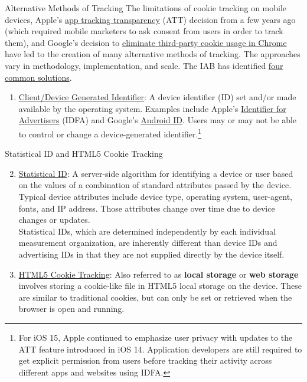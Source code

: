 \documentclass[pdf]{beamer}
\newcommand{\empr}[1]{{\color{franklinblue}\textbf{#1}}}
\theoremstyle{remark}
\theoremstyle{definition}
\begin{document}
\begin{frame}[t]{Alternative Methods of Tracking}
The limitations of cookie tracking on mobile devices, Apple's \href{https://www.apple.com/newsroom/2021/01/data-privacy-day-at-apple-improving-transparency-and-empowering-users/}{app tracking transparency} (ATT) decision from a few years ago (which required mobile marketers to ask consent from users in order to track them), and Google's decision to \href{https://blog.google/products/chrome/privacy-sandbox-tracking-protection/}{eliminate third-party cookie usage in Chrome} have led to the creation of many
alternative methods of tracking. The approaches vary in methodology, implementation, and scale.  The IAB has identified \href{https://www.iab.com/wp-content/uploads/2015/08/IABDigitalSimplifiedMobileCookies.pdf}{four common solutions}. \\
\vspace{0.5ex}
\small
\begin{enumerate}
\item \underline{Client/Device Generated Identifier}: A device identifier (ID) set and/or made available by the operating system. Examples include Apple's  \href{https://developer.apple.com/documentation/adsupport/asidentifiermanager/advertisingidentifier}{Identifier for Advertisers} (IDFA) and  Google's  \href{https://support.google.com/googleplay/android-developer/answer/6048248?hl=en\#zippy=\%2Cpersistent-identifiers-including-android-id}{Android ID}.  Users may or may not be able to control or change a device-generated identifier.\footnote{For iOS 15, Apple continued to emphasize user privacy with updates to the ATT feature introduced in iOS 14. Application developers are still required to get explicit permission from users before tracking their activity across different apps and websites using IDFA.}
\end{enumerate}
\end{frame}

\begin{frame}[t]{Statistical ID and HTML5 Cookie Tracking}
\small
\begin{enumerate}
  \setcounter{enumi}{1}
\item \underline{Statistical ID}: A server-side algorithm for identifying a device or user based on the values of a combination of standard attributes passed by the device. Typical device attributes include device type, operating system, user-agent, fonts, and IP address. Those attributes change over time due to device changes or updates. \\
\vspace{1.5ex}
Statistical IDs, which are determined independently by each individual measurement organization, are inherently different than device IDs and advertising IDs in that they are not supplied directly by the device itself. 
\item \underline{HTML5 Cookie Tracking}: Also referred to as \empr{local storage} or \empr{web storage} involves storing a cookie-like file in HTML5 local storage on the device. These are similar to traditional cookies, but can only be set or retrieved when the browser is open and running.
\end{enumerate}
\end{frame}
\end{document}
